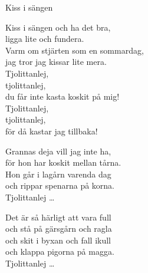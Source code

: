 \begin{song}{Kiss i sängen}

	
	Kiss i sängen och ha det bra,\\
	ligga lite och fundera.\\
	Varm om stjärten som en sommardag,\\
	jag tror jag kissar lite mera.\\
	Tjolittanlej,\\
	tjolittanlej,\\
	du får inte kasta koskit på mig!\\
	Tjolittanlej,\\
	tjolittanlej,\\
	för då kastar jag tillbaka!
	
	Grannas deja vill jag inte ha,\\
	för hon har koskit mellan tårna.\\
	Hon går i lagårn varenda dag\\
	och rippar spenarna på korna.\\
	Tjolittanlej \ldots{}
	
	Det är så härligt att vara full\\
	och stå på gärsgårn och ragla\\
	och skit i byxan och fall ikull\\
	och klappa pigorna på magga.\\
	Tjolittanlej \ldots{}
	
\end{song}
